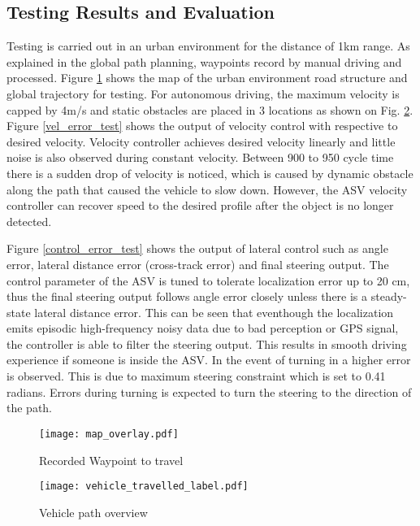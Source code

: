 \documentclass[10 pt,a4paper,conference]{IEEEtran}
\begin{document}
\subsection{Testing Results and
Evaluation}\label{testing-results-and-evaluation}

Testing is carried out in an urban environment for the distance of 1km
range. As explained in the global path planning, waypoints record by
manual driving and processed. Figure \ref{map_waypoint} shows the map of
the urban environment road structure and global trajectory for testing.
For autonomous driving, the maximum velocity is capped by 4m/s and
static obstacles are placed in 3 locations as shown on Fig.
\ref{veh_path_overview}. Figure \ref{vel_error_test} shows the output of
velocity control with respective to desired velocity. Velocity
controller achieves desired velocity linearly and little noise is also
observed during constant velocity. Between 900 to 950 cycle time there
is a sudden drop of velocity is noticed, which is caused by dynamic
obstacle along the path that caused the vehicle to slow down. However,
the ASV velocity controller can recover speed to the desired profile
after the object is no longer detected.

Figure \ref{control_error_test} shows the output of lateral control such
as angle error, lateral distance error (cross-track error) and final
steering output. The control parameter of the ASV is tuned to tolerate
localization error up to 20 cm, thus the final steering output follows
angle error closely unless there is a steady-state lateral distance
error. This can be seen that eventhough the localization emits episodic
high-frequency noisy data due to bad perception or GPS signal, the
controller is able to filter the steering output. This results in smooth
driving experience if someone is inside the ASV. In the event of turning
in a higher error is observed. This is due to maximum steering
constraint which is set to 0.41 radians. Errors during turning is
expected to turn the steering to the direction of the path.

\begin{figure}[!t]
\centering
\texttt{[image: map\_overlay.pdf]}
\caption{Recorded Waypoint to travel}
\label{map_waypoint}
\end{figure}

\begin{figure}[!t]
\centering
\texttt{[image: vehicle\_travelled\_label.pdf]}
\caption{Vehicle path overview}
\label{veh_path_overview}
\end{figure}
\end{document}
